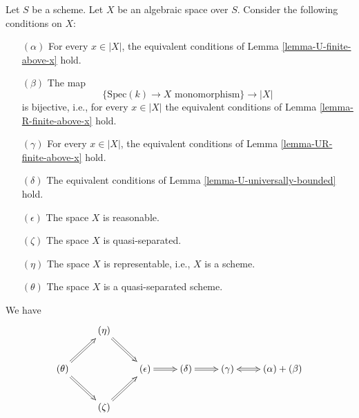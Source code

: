 \begin{lemma}
\label{lemma-bounded-fibres}
Let $S$ be a scheme. Let $X$ be an algebraic space over $S$.
Consider the following conditions on $X$:
\begin{enumerate}
\item[$(\alpha)$] For every $x \in |X|$, the equivalent conditions of
Lemma \ref{lemma-U-finite-above-x} hold.
\item[$(\beta)$] The map
$$
\{\text{Spec}(k) \to X \text{ monomorphism}\}
\longrightarrow
|X|
$$
is bijective, i.e., for every $x \in |X|$ the equivalent conditions of
Lemma \ref{lemma-R-finite-above-x} hold.
\item[$(\gamma)$] For every $x \in |X|$, the equivalent conditions of
Lemma \ref{lemma-UR-finite-above-x} hold.
\item[$(\delta)$] The equivalent conditions of
Lemma \ref{lemma-U-universally-bounded} hold.
\item[$(\epsilon)$] The space $X$ is reasonable.
\item[$(\zeta)$] The space $X$ is quasi-separated.
\item[$(\eta)$] The space $X$ is representable, i.e., $X$ is a scheme.
\item[$(\theta)$] The space $X$ is a quasi-separated scheme.
\end{enumerate}
We have
$$
\xymatrix{
& (\eta) \ar@{=>}[rd] & & & &  \\
(\theta) \ar@{=>}[ru] \ar@{=>}[rd] & & 
(\epsilon) \ar@{=>}[r] &
(\delta) \ar@{=>}[r] &
(\gamma) \ar@{<=>}[r] & (\alpha) + (\beta) \\
& (\zeta) \ar@{=>}[ru] & & & & 
}
$$
\end{lemma}

